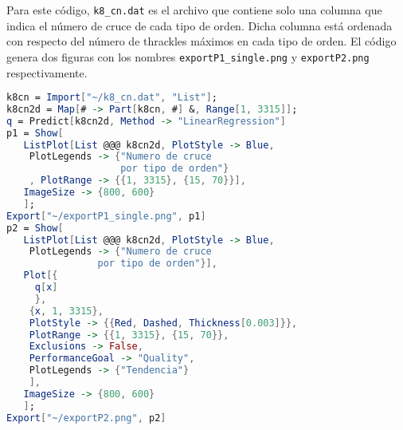 \label{apendice_codigo_figuras}
Para este código, \texttt{k8\_cn.dat} es el archivo que contiene solo
una columna que indica el número de cruce de cada tipo de orden. Dicha
columna está ordenada con respecto del número de thrackles máximos en
cada tipo de orden. El código genera dos figuras con los nombres \texttt{exportP1\_single.png} y \texttt{exportP2.png} respectivamente.
\begin{lstlisting}[frame=single, language= Mathematica]
k8cn = Import["~/k8_cn.dat", "List"];
k8cn2d = Map[# -> Part[k8cn, #] &, Range[1, 3315]];
q = Predict[k8cn2d, Method -> "LinearRegression"]
p1 = Show[
   ListPlot[List @@@ k8cn2d, PlotStyle -> Blue,
    PlotLegends -> {"Numero de cruce
                    por tipo de orden"}
    , PlotRange -> {{1, 3315}, {15, 70}}],
   ImageSize -> {800, 600}
   ];
Export["~/exportP1_single.png", p1]
p2 = Show[
   ListPlot[List @@@ k8cn2d, PlotStyle -> Blue,
    PlotLegends -> {"Numero de cruce
                por tipo de orden"}],
   Plot[{
     q[x]
     },
    {x, 1, 3315},
    PlotStyle -> {{Red, Dashed, Thickness[0.003]}},
    PlotRange -> {{1, 3315}, {15, 70}},
    Exclusions -> False,
    PerformanceGoal -> "Quality",
    PlotLegends -> {"Tendencia"}
    ],
   ImageSize -> {800, 600}
   ];
Export["~/exportP2.png", p2]
\end{lstlisting}
